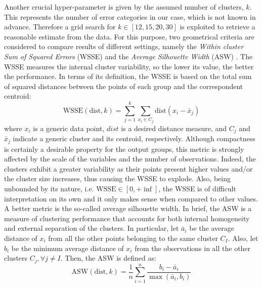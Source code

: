Another crucial hyper-parameter is given by the assumed number of clusters, $k$. This represents the number of error categories in our case, which is not known in advance. 
Therefore a grid search for $k \in [12, 15, 20, 30] $ is exploited to retrieve a reasonable estimate from the data.
For this purpose, two geometrical criteria are considered to compare results of different settings, namely the \textit{Within cluster Sum of Squared Errors} (WSSE) and the \textit{Average Silhouette Width} (ASW) \cite{rousseeuw1987ASW}.
The WSSE measures the internal cluster variability, so the lower its value, the better the performance.
In terms of its definition, the WSSE is based on the total sum of squared distances between the points of each group and the correspondent centroid:
\begin{equation}
    \text{WSSE}\left(\text{dist}, k\right) = 
    \sum_{j=1}^{k}{ 
    \sum_{x_i \in C_j}{\text{dist}\left( x_i - \bar{x}_j\right)} 
    }
\end{equation}
where $x_i$ is a generic data point, ${dist}$ is a desired distance measure, and $C_j$ and $\bar{x}_j$ indicate a generic cluster and its centroid, respectively.
Although compactness is certainly a desirable property for the output groups, this metric is strongly affected by the scale of the variables and the number of observations. Indeed, the clusters exhibit a greater variability as their points present higher values and/or the cluster size increases, thus causing the WSSE to explode. 
Also, being unbounded by its nature, i.e. $\text{WSSE} \in \left[ 0, +\inf \right]$, the WSSE is of difficult interpretation on its own and it only makes sense when compared to other values. \\
A better metric is the so-called average silhouette width. In brief, the ASW is a measure of clustering performance that accounts for both internal homogeneity and external separation of the clusters.
In particular, let $\bar{a}_i$ be the average distance of $x_i$ from all the other points belonging to the same cluster $C_I$. Also, let $b_i$ be the minimum average distance of $x_i$ from the observations in all the other clusters $C_j , \forall j \neq I$. Then, the ASW is defined as:
\begin{equation}
    \text{ASW}\left(\text{dist}, k\right) = 
    \dfrac{1}{n} \sum_{i=1}^{n}{ 
    \dfrac{b_i - \bar{a}_i}{ \max\left( \bar{a}_i, b_i \right) }
    }
\end{equation}
